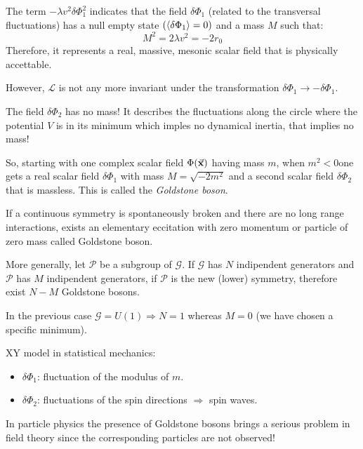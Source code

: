 \documentclass[../main/main.tex]{subfiles}
\begin{document}
\begin{remark}
The term \( - \lambda v^2 \delta \Phi _1^2 \) indicates that the field \( \delta \Phi _1 \) (related to the transversal fluctuations) has a null empty state \( ( \expval{\delta \Phi _1}= 0 ) \) and a mass \( M \) such that:
\begin{equation}
  M^2 = 2 \lambda v^2 = - 2 r_0
\end{equation}
Therefore, it represents a real, massive, mesonic scalar field that is physically accettable.

However, \( \mathcal{L} \) is not any more invariant under the transformation \( \delta \Phi _1 \rightarrow - \delta \Phi _1 \).
\end{remark}
\begin{remark}
The field \( \delta \Phi _2 \) has no mass! It describes the fluctuations along the circle where the potential \( V \) is in its minimum  which imples no dynamical inertia, that implies no mass!
\end{remark}
So, starting with one complex scalar field \( \Phi (\va{x}) \) having mass \( m \), when \( m^2 < 0 \)one gets a real scalar field \( \delta \Phi _1 \) with mass \( M = \sqrt{- 2 m^2}  \)  and a second scalar field \( \delta \Phi _2 \) that is massless. This is called the \emph{Goldstone boson}.
\begin{theorem}[]
If a continuous symmetry is spontaneously broken and there are no long range interactions, exists an elementary eccitation with zero momentum or particle of zero mass called Goldstone boson.
\end{theorem}
More generally, let \( \mathcal{P} \) be a subgroup of \( \mathcal{G} \). If \( \mathcal{G} \) has \( N \) indipendent generators and \( \mathcal{P} \)  has \( M \) indipendent generators, if \( \mathcal{P} \) is the new (lower) symmetry, therefore exist \( N-M \)  Goldstone bosons.

In the previous case \( \mathcal{G} = U (1)  \Rightarrow  N=1\) whereas \( M=0 \) (we have chosen a specific minimum).
\begin{example}{}{}
XY model in statistical mechanics:
\begin{itemize}
\item \( \delta \Phi _1 \): fluctuation of the modulus of \( m \).
\item \( \delta \Phi _2 \): fluctuations of the spin directions \( \Rightarrow  \) spin waves.
\end{itemize}
\end{example}
\begin{remark}
In particle physics the presence of Goldstone bosons brings a serious problem in field theory since the corresponding particles are not observed!
\end{remark}
\end{document}
